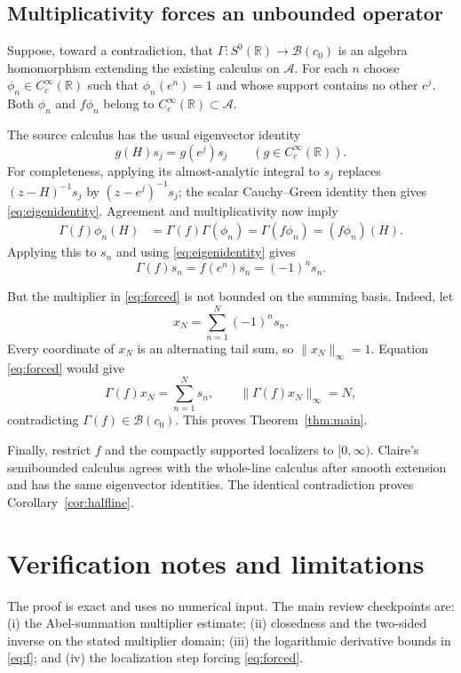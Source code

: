 \documentclass[11pt]{article}
\theoremstyle{remark}
\newcommand{\A}{\mathcal A}
\newcommand{\B}{\mathcal B}
\newcommand{\R}{\mathbb R}
\newcommand{\norm}[1]{\lVert #1\rVert}
\begin{document}
\subsection{Multiplicativity forces an unbounded operator}

Suppose, toward a contradiction, that $\Gamma:S^0(\R)\to\B(c_0)$ is an
algebra homomorphism extending the existing calculus on $\A$.  For each $n$
choose $\phi_n\in C_c^\infty(\R)$ such that $\phi_n(e^n)=1$ and whose support
contains no other $e^j$.  Both $\phi_n$ and $f\phi_n$ belong to
$C_c^\infty(\R)\subset\A$.

The source calculus has the usual eigenvector identity
\begin{equation}\label{eq:eigenidentity}
 g(H)s_j=g(e^j)s_j\qquad(g\in C_c^\infty(\R)).
\end{equation}
For completeness, applying its almost-analytic integral to $s_j$ replaces
$(z-H)^{-1}s_j$ by $(z-e^j)^{-1}s_j$; the scalar Cauchy--Green identity then
gives \eqref{eq:eigenidentity}.  Agreement and multiplicativity now imply
\begin{align*}
 \Gamma(f)\phi_n(H)
 &=\Gamma(f)\Gamma(\phi_n)
  =\Gamma(f\phi_n)=(f\phi_n)(H).
\end{align*}
Applying this to $s_n$ and using \eqref{eq:eigenidentity} gives
\begin{equation}\label{eq:forced}
 \Gamma(f)s_n=f(e^n)s_n=(-1)^ns_n.
\end{equation}

But the multiplier in \eqref{eq:forced} is not bounded on the summing basis.
Indeed, let
\[
 x_N=\sum_{n=1}^N(-1)^ns_n.
\]
Every coordinate of $x_N$ is an alternating tail sum, so
$\norm{x_N}_\infty=1$.  Equation \eqref{eq:forced} would give
\[
 \Gamma(f)x_N=\sum_{n=1}^Ns_n,
 \qquad
 \norm{\Gamma(f)x_N}_\infty=N,
\]
contradicting $\Gamma(f)\in\B(c_0)$.  This proves
Theorem~\ref{thm:main}.

Finally, restrict $f$ and the compactly supported localizers to
$[0,\infty)$.  Claire's semibounded calculus agrees with the whole-line
calculus after smooth extension and has the same eigenvector identities.
The identical contradiction proves Corollary~\ref{cor:halfline}.

\section{Verification notes and limitations}

The proof is exact and uses no numerical input.  The main review checkpoints
are: (i) the Abel-summation multiplier estimate; (ii) closedness and the
two-sided inverse on the stated multiplier domain; (iii) the logarithmic
derivative bounds in \eqref{eq:f}; and (iv) the localization step forcing
\eqref{eq:forced}.
\end{document}

